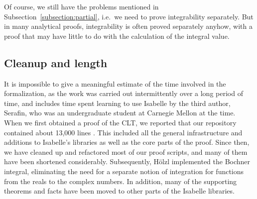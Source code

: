 \documentclass{svjour3}
\begin{document}
Of course, we still have the problems mentioned in Subsection~\ref{subsection:partial}, i.e.~we need to prove integrability separately. But in many analytical proofs, integrability is often proved separately anyhow, with a proof that may have little to do with the calculation of the integral value.

\subsection{Cleanup and length}

It is impossible to give a meaningful estimate of the time involved in the formalization, as the work was carried out intermittently over a long period of time, and includes time spent learning to use Isabelle by the third author, Serafin, who was an undergraduate student at Carnegie Mellon at the time. When we first obtained a proof of the CLT, we reported that our repository contained about 13,000 lines \cite{avigad:hoelzl:serafin:14}. This included all the general infrastructure and additions to Isabelle's libraries as well as the core parts of the proof. Since then, we have cleaned up and refactored most of our proof scripts, and many of them have been shortened considerably. Subsequently, H\"olzl implemented the Bochner integral, eliminating the need for a separate notion of integration for functions from the reals to the complex numbers. In addition, many of the supporting theorems and facts have been moved to other parts of the Isabelle libraries. 
\end{document}
